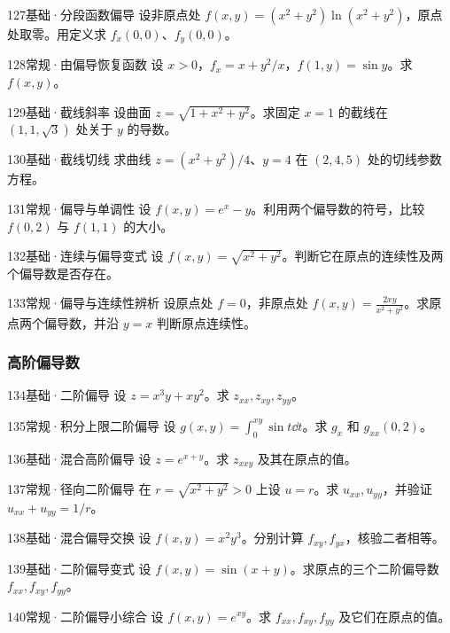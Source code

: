 \begin{exercise}{127}{基础·分段函数偏导}
设非原点处 $f(x,y)=(x^2+y^2)\ln(x^2+y^2)$，原点处取零。用定义求 $f_x(0,0)$、$f_y(0,0)$。
\end{exercise}
\begin{exercise}{128}{常规·由偏导恢复函数}
设 $x>0$，$f_x=x+y^2/x$，$f(1,y)=\sin y$。求 $f(x,y)$。
\end{exercise}
\begin{exercise}{129}{基础·截线斜率}
设曲面 $z=\sqrt{1+x^2+y^2}$。求固定 $x=1$ 的截线在 $(1,1,\sqrt3)$ 处关于 $y$ 的导数。
\end{exercise}
\begin{exercise}{130}{基础·截线切线}
求曲线 $z=(x^2+y^2)/4$、$y=4$ 在 $(2,4,5)$ 处的切线参数方程。
\end{exercise}
\begin{exercise}{131}{常规·偏导与单调性}
设 $f(x,y)=e^x-y$。利用两个偏导数的符号，比较 $f(0,2)$ 与 $f(1,1)$ 的大小。
\end{exercise}
\begin{exercise}{132}{基础·连续与偏导变式}
设 $f(x,y)=\sqrt{x^2+y^2}$。判断它在原点的连续性及两个偏导数是否存在。
\end{exercise}
\begin{exercise}{133}{常规·偏导与连续性辨析}
设原点处 $f=0$，非原点处 $f(x,y)=\frac{2xy}{x^2+y^2}$。求原点两个偏导数，并沿 $y=x$ 判断原点连续性。
\end{exercise}
\subsubsection{高阶偏导数}
\begin{exercise}{134}{基础·二阶偏导}
设 $z=x^3y+xy^2$。求 $z_{xx},z_{xy},z_{yy}$。
\end{exercise}
\begin{exercise}{135}{常规·积分上限二阶偏导}
设 $g(x,y)=\int_0^{xy}\sin t\dd t$。求 $g_x$ 和 $g_{xx}(0,2)$。
\end{exercise}
\begin{exercise}{136}{基础·混合高阶偏导}
设 $z=e^{x+y}$。求 $z_{xxy}$ 及其在原点的值。
\end{exercise}
\begin{exercise}{137}{常规·径向二阶偏导}
在 $r=\sqrt{x^2+y^2}>0$ 上设 $u=r$。求 $u_{xx},u_{yy}$，并验证 $u_{xx}+u_{yy}=1/r$。
\end{exercise}
\begin{exercise}{138}{基础·混合偏导交换}
设 $f(x,y)=x^2y^3$。分别计算 $f_{xy},f_{yx}$，核验二者相等。
\end{exercise}
\begin{exercise}{139}{基础·二阶偏导变式}
设 $f(x,y)=\sin(x+y)$。求原点的三个二阶偏导数 $f_{xx},f_{xy},f_{yy}$。
\end{exercise}
\begin{exercise}{140}{常规·二阶偏导小综合}
设 $f(x,y)=e^{xy}$。求 $f_{xx},f_{xy},f_{yy}$ 及它们在原点的值。
\end{exercise}
